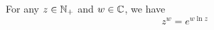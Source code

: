 \begin{theorem}
    For any $z \in \mathbb{N}_{+}$ and $w \in \mathbb{C}$, we have
    \begin{equation}
        z^w = e^{w \ln z}
    \end{equation}
\end{theorem}












































































































